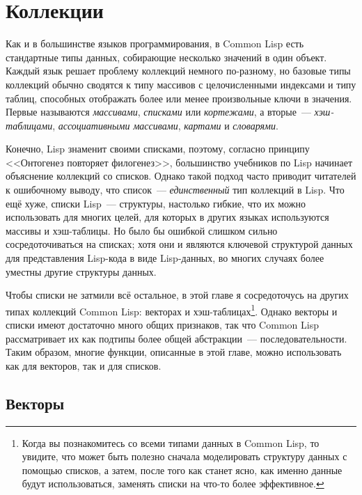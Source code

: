 \chapter{Коллекции}
\label{ch:11}

Как и в большинстве языков программирования, в Common Lisp есть стандартные типы данных,
собирающие несколько значений в один объект.  Каждый язык решает проблему коллекций
немного по-разному, но базовые типы коллекций обычно сводятся к типу массивов с целочисленными
индексами и типу таблиц, способных отображать более или менее
произвольные ключи в значения.  Первые называются \textit{массивами}, \textit{списками} или \textit{кортежами}, а
вторые~--- \textit{хэш-таблицами}, \textit{ассоциативными массивами}, \textit{картами} и \textit{словарями}.

Конечно, Lisp знаменит своими списками, поэтому, согласно принципу <<Онтогенез повторяет
филогенез>>, большинство учебников по Lisp начинает объяснение коллекций со
списков. Однако такой подход часто приводит читателей к ошибочному выводу, что
список~--- \textit{единственный} тип коллекций в Lisp.  Что ещё хуже,
списки Lisp~--- структуры, настолько гибкие, что их можно использовать для многих целей, для
которых в других языках используются массивы и хэш-таблицы.  Но было бы ошибкой слишком
сильно сосредоточиваться на списках; хотя они и являются ключевой структурой данных для
представления Lisp-кода в виде Lisp-данных, во многих случаях более уместны другие структуры данных.

Чтобы списки не затмили всё остальное, в этой главе я сосредоточусь на других типах
коллекций Common Lisp: векторах и хэш-таблицах\footnote{Когда вы познакомитесь со всеми
  типами данных в Common Lisp, то увидите, что может быть полезно сначала моделировать
  структуру данных с помощью списков, а затем, после того как станет ясно, как именно данные
  будут использоваться, заменять списки на что-то более эффективное.}.
Однако векторы и списки имеют достаточно много общих признаков, так что Common Lisp
рассматривает их как подтипы более общей абстракции~--- последовательности.  Таким образом,
многие функции, описанные в этой главе, можно использовать как для векторов, так и для
списков.

\section{Векторы}

